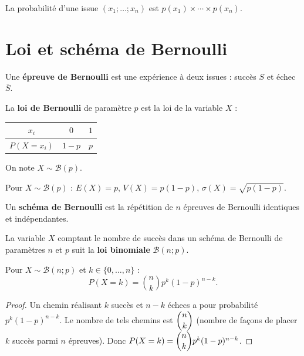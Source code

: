 \documentclass[11pt,a4paper,openany]{book}
\theoremstyle{definition}
\begin{document}
    \begin{Propriété}
        La probabilité d'une issue $(x_1;\ldots;x_n)$ est
        $p(x_1)\times\cdots\times p(x_n)$.
    \end{Propriété}

    \section{Loi et schéma de Bernoulli}
    \begin{Définition}
        Une \textbf{épreuve de Bernoulli} est une expérience à deux issues : succès $S$ et
        échec $\bar{S}$.
    \end{Définition}

    \begin{Définition}
        La \textbf{loi de Bernoulli} de paramètre $p$ est la loi de la variable $X$ :
        \begin{center}
        \begin{tabular}{|c|c|c|}
        \hline
        $x_i$ & $0$ & $1$ \\
        \hline
        $P(X=x_i)$ & $1-p$ & $p$ \\
        \hline
        \end{tabular}
        \end{center}
        On note $X\sim\mathcal{B}(p)$.
    \end{Définition}

    \begin{Propriété}
        Pour $X\sim\mathcal{B}(p)$ : $E(X)=p$, $V(X)=p(1-p)$,
        $\sigma(X)=\sqrt{p(1-p)}$.
    \end{Propriété}

    \begin{Définition}
        Un \textbf{schéma de Bernoulli} est la répétition de $n$ épreuves de Bernoulli
        identiques et indépendantes.
    \end{Définition}

    \begin{Définition}
        La variable $X$ comptant le nombre de succès dans un schéma de Bernoulli de
        paramètres $n$ et $p$ suit la \textbf{loi binomiale} $\mathcal{B}(n;p)$.
    \end{Définition}

    \begin{Propriété}
        Pour $X\sim\mathcal{B}(n;p)$ et $k\in\{0,\ldots,n\}$ :
        \[
            P(X=k)=\binom{n}{k}p^k(1-p)^{n-k}.
        \]
    \end{Propriété}
    \begin{proof}
        Un chemin réalisant $k$ succès et $n-k$ échecs a pour probabilité $p^k(1-p)^{n-k}$.
        Le nombre de tels chemins est $\dbinom{n}{k}$ (nombre de façons de placer $k$ succès
        parmi $n$ épreuves). Donc $P(X=k)=\dbinom{n}{k}p^k(1-p)^{n-k}$.
    \end{proof}
\end{document}

